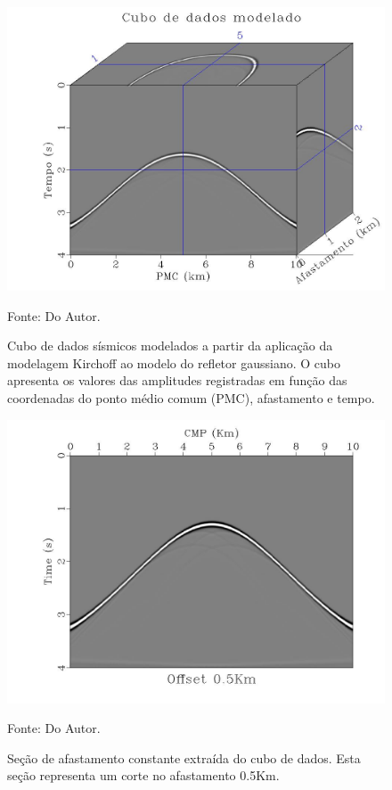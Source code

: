 \begin{figure}[htb]
\caption{Cubo de dados sísmicos modelados a partir da aplicação da modelagem Kirchoff ao modelo
do refletor gaussiano. O cubo apresenta os valores das amplitudes registradas em função das coordenadas do
ponto médio comum (PMC), afastamento e tempo.}
\begin{center}
\includegraphics[scale=0.3]{images/dataCube.jpeg}
\vspace{-0.3cm}
\end{center}
\begin{center}
 Fonte: Do Autor.
\end{center}
\label{fig:5.2}
\end{figure}


\begin{figure}[htb]
\caption{Seção de afastamento constante extraída do cubo de dados. Esta seção representa um corte no
afastamento 0.5Km.}
\begin{center}
\includegraphics[scale=0.3]{images/off-40.jpeg}
\vspace{-0.3cm}
\end{center}
\begin{center}
 Fonte: Do Autor.
\end{center}
\label{fig:5.3}
\end{figure}

